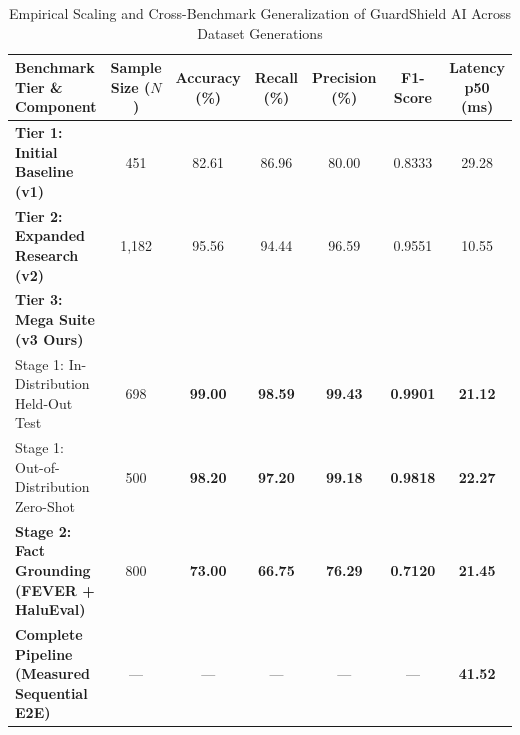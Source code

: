 
\begin{table}[t]
\centering
\small
\caption{Empirical Scaling and Cross-Benchmark Generalization of GuardShield AI Across Dataset Generations}
\label{tab:mega_benchmark_results}
\begin{tabular}{lcccccc}
\toprule
\textbf{Benchmark Tier \& Component} & \textbf{Sample Size ($N$)} & \textbf{Accuracy (\%)} & \textbf{Recall (\%)} & \textbf{Precision (\%)} & \textbf{F1-Score} & \textbf{Latency p50 (ms)} \\
\midrule
\textbf{Tier 1: Initial Baseline (v1)} & 451 & 82.61 & 86.96 & 80.00 & 0.8333 & 29.28 \\
\textbf{Tier 2: Expanded Research (v2)} & 1,182 & 95.56 & 94.44 & 96.59 & 0.9551 & 10.55 \\
\midrule
\textbf{Tier 3: Mega Suite (v3 Ours)} & & & & & & \\
\quad Stage 1: In-Distribution Held-Out Test & 698 & \textbf{99.00} & \textbf{98.59} & \textbf{99.43} & \textbf{0.9901} & \textbf{21.12} \\
\quad Stage 1: Out-of-Distribution Zero-Shot & 500 & \textbf{98.20} & \textbf{97.20} & \textbf{99.18} & \textbf{0.9818} & \textbf{22.27} \\
\midrule
\textbf{Stage 2: Fact Grounding (FEVER + HaluEval)} & 800 & \textbf{73.00} & \textbf{66.75} & \textbf{76.29} & \textbf{0.7120} & \textbf{21.45} \\
\midrule
\textbf{Complete Pipeline (Measured Sequential E2E)} & — & — & — & — & — & \textbf{41.52} \\
\bottomrule
\end{tabular}
\end{table}
